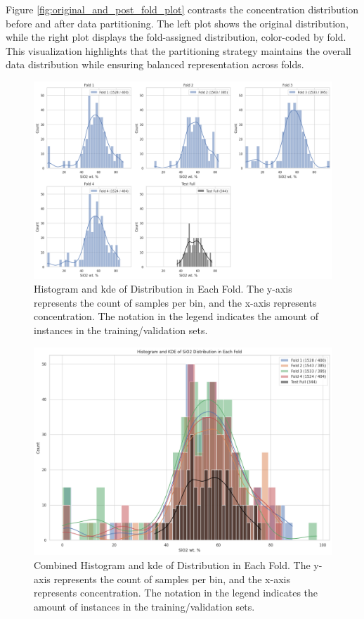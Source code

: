 Figure \ref{fig:original_and_post_fold_plot} contrasts the  concentration distribution before and after data partitioning.
The left plot shows the original distribution, while the right plot displays the fold-assigned distribution, color-coded by fold.
This visualization highlights that the partitioning strategy maintains the overall data distribution while ensuring balanced representation across folds.

\begin{figure}[h!]
    \centering
    \includegraphics[width=\textwidth]{images/histogram_grid_plot.png}
    \caption{Histogram and \gls{kde} of  Distribution in Each Fold. The y-axis represents the count of samples per bin, and the x-axis represents  concentration. The notation in the legend indicates the amount of instances in the training/validation sets.}
    \label{fig:histogram_grid_plot}
\end{figure}

\begin{figure}[h!]
    \centering
    \includegraphics[width=\textwidth]{images/histogram_kde_plot.png}
    \caption{Combined Histogram and \gls{kde} of  Distribution in Each Fold. The y-axis represents the count of samples per bin, and the x-axis represents  concentration. The notation in the legend indicates the amount of instances in the training/validation sets.}
    \label{fig:histogram_kde_plot}
\end{figure}

